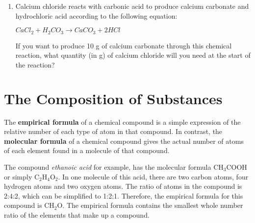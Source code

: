 {\begin{enumerate}
{	\begin{enumerate}
	\item{What mass of zinc will you need for the reaction, if all the sulfur is to be used up?}
	\item{What mass of zinc sulfide will this reaction produce?}
	\end{enumerate}
}

\item{Calcium chloride reacts with carbonic acid to produce calcium carbonate and hydrochloric acid according to the following equation:
\begin{center}
\rm${CaCl_{2} + H_{2}CO_{3} \rightarrow CaCO_{3} + 2HCl}$
\end{center}
If you want to produce 10 g of calcium carbonate through this chemical reaction, what quantity (in g) of calcium chloride will you need at the start of the reaction?}



\end{enumerate}
\practiceinfo
}







\section{The Composition of Substances}
\label{sec:quant:composition}

The \textbf{empirical formula} of a chemical compound is a simple expression of the relative number of each type of atom in that compound. In contrast, the \textbf{molecular formula} of a chemical compound gives the actual number of atoms of each element found in a molecule of that compound.



The compound \textit{ethanoic acid} for example, has the molecular formula CH$_{3}$COOH or simply C$_{2}$H$_{4}$O$_{2}$. In one molecule of this acid, there are two carbon atoms, four hydrogen atoms and two oxygen atoms. The ratio of atoms in the compound is 2:4:2, which can be simplified to 1:2:1. Therefore, the empirical formula for this compound is CH$_{2}$O. The empirical formula contains the smallest whole number ratio of the elements that make up a compound.\\

